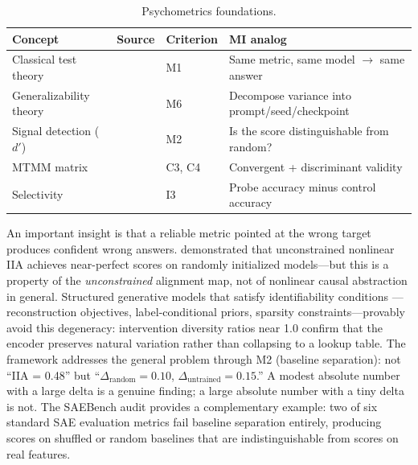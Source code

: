 \documentclass[10pt]{article}
\begin{document}
\begin{table}[H]
\centering\small
\caption{Psychometrics foundations.}
\renewcommand{\arraystretch}{1.12}
\begin{tabular}{@{}l>{\raggedright\arraybackslash}p{2.2cm}l>{\raggedright\arraybackslash}p{4.5cm}@{}}
\toprule
\textbf{Concept} & \textbf{Source} & \textbf{Criterion} & \textbf{MI analog} \\
\midrule
Classical test theory & \citet{lord1968statistical} & M1 & Same metric, same model $\to$ same answer \\
\midrule
Generalizability theory & \citet{cronbach1972dependability} & M6 & Decompose variance into prompt/seed/checkpoint \\
\midrule
Signal detection ($d'$) & \citet{green1966signal} & M2 & Is the score distinguishable from random? \\
\midrule
MTMM matrix & \citet{campbell1959convergent} & C3, C4 & Convergent + discriminant validity \\
\midrule
Selectivity & \citet{hewitt2019designing} & I3 & Probe accuracy minus control accuracy \\
\bottomrule
\end{tabular}
\end{table}

An important insight is that a reliable metric pointed at the wrong target produces confident wrong answers. \citet{sutter2025nonlinear} demonstrated that unconstrained nonlinear IIA achieves near-perfect scores on randomly initialized models---but this is a property of the \emph{unconstrained} alignment map, not of nonlinear causal abstraction in general. Structured generative models that satisfy identifiability conditions \citep{khemakhem2020variational}---reconstruction objectives, label-conditional priors, sparsity constraints---provably avoid this degeneracy: intervention diversity ratios near 1.0 confirm that the encoder preserves natural variation rather than collapsing to a lookup table. The framework addresses the general problem through M2 (baseline separation): not ``IIA = 0.48'' but ``$\Delta_{\text{random}} = 0.10$, $\Delta_{\text{untrained}} = 0.15$.'' A modest absolute number with a large delta is a genuine finding; a large absolute number with a tiny delta is not. The SAEBench audit \citep{karvonen2025saebench} provides a complementary example: two of six standard SAE evaluation metrics fail baseline separation entirely, producing scores on shuffled or random baselines that are indistinguishable from scores on real features.
\end{document}
